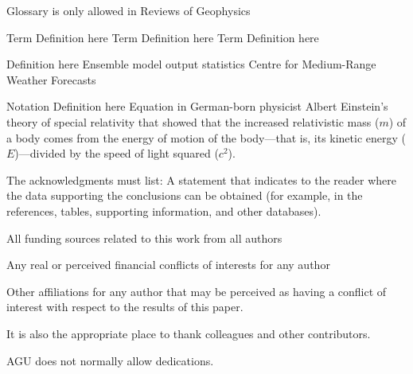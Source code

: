 \documentclass[draft,linenumbers]{agujournal2018}
\begin{document}
Glossary is only allowed in Reviews of Geophysics

\begin{glossary}
 Term Definition here
 Term Definition here
 Term Definition here
\end{glossary}

\begin{acronyms}
 Definition here
 Ensemble model output statistics
 Centre for Medium-Range Weather Forecasts
\end{acronyms}

\begin{notation}
 Notation Definition here
Equation in German-born physicist Albert Einstein's theory of special
relativity that showed that the increased relativistic mass ($m$) of a
body comes from the energy of motion of the body—that is, its kinetic
energy ($E$)—divided by the speed of light squared ($c^2$).
\end{notation}

\acknowledgments

The acknowledgments must list: A statement that indicates to the reader
where the data supporting the conclusions can be obtained (for example,
in the references, tables, supporting information, and other databases).

All funding sources related to this work from all authors

Any real or perceived financial conflicts of interests for any author

Other affiliations for any author that may be perceived as having a
conflict of interest with respect to the results of this paper.

It is also the appropriate place to thank colleagues and other
contributors.

AGU does not normally allow dedications.


\end{document}
